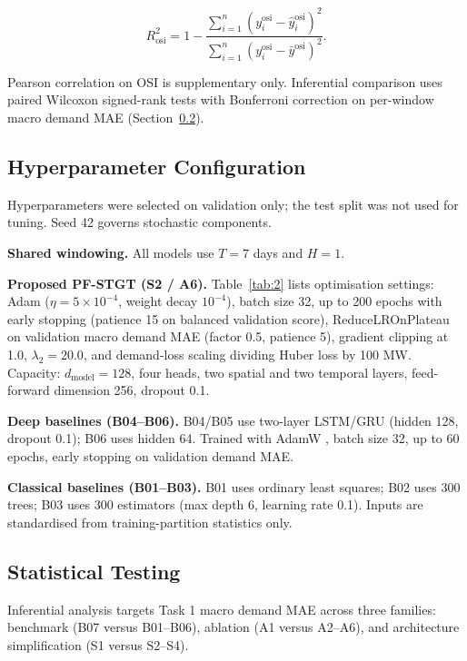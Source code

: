 \[
R^2_{\mathrm{osi}} = 1 - \frac{\sum_{i=1}^{n} \left( y^{\mathrm{osi}}_i - \hat{y}^{\mathrm{osi}}_i \right)^2}{\sum_{i=1}^{n} \left( y^{\mathrm{osi}}_i - \bar{y}^{\mathrm{osi}} \right)^2}.
\]

Pearson correlation on OSI is supplementary only. Inferential comparison uses paired Wilcoxon signed-rank tests \cite{Wilcoxon1945SignedRank} with Bonferroni correction \cite{Dunn1961Bonferroni} on per-window macro demand MAE (Section~\ref{subsection:statistical_testing}).

\subsection{Hyperparameter Configuration}\label{subsection:hyperparameter_configuration}

Hyperparameters were selected on validation only; the test split was not used for tuning. Seed 42 governs stochastic components.

\textbf{Shared windowing.} All models use \(T = 7\) days and \(H = 1\).

\textbf{Proposed PF-STGT (S2 / A6).} Table~\ref{tab:2} lists optimisation settings: Adam \cite{Kingma2015Adam} (\(\eta = 5 \times 10^{-4}\), weight decay \(10^{-4}\)), batch size 32, up to 200 epochs with early stopping (patience 15 on balanced validation score), ReduceLROnPlateau on validation macro demand MAE (factor 0.5, patience 5), gradient clipping at 1.0, \(\lambda_2 = 20.0\), and demand-loss scaling dividing Huber loss by 100 MW. Capacity: \(d_{\mathrm{model}} = 128\), four heads, two spatial and two temporal layers, feed-forward dimension 256, dropout 0.1.

\textbf{Deep baselines (B04--B06).} B04/B05 use two-layer LSTM/GRU (hidden 128, dropout 0.1); B06 uses hidden 64. Trained with AdamW \cite{Loshchilov2019AdamW}, batch size 32, up to 60 epochs, early stopping on validation demand MAE.

\textbf{Classical baselines (B01--B03).} B01 uses ordinary least squares; B02 uses 300 trees; B03 uses 300 estimators (max depth 6, learning rate 0.1). Inputs are standardised from training-partition statistics only.

\subsection{Statistical Testing}\label{subsection:statistical_testing}

Inferential analysis targets Task 1 macro demand MAE across three families: benchmark (B07 versus B01--B06), ablation (A1 versus A2--A6), and architecture simplification (S1 versus S2--S4).

